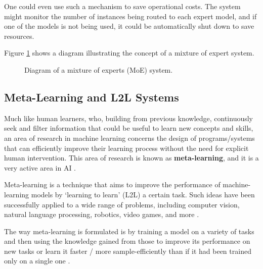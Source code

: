 \documentclass[../main.tex]{subfiles}
\begin{document}
    One could even use such a mechanism to save operational costs. The system might monitor the number of instances being routed to each expert model, and if one of the models is not being used, it could be automatically shut down to save resources.

    Figure \ref{fig:moes} shows a diagram illustrating the concept of a mixture of expert system.

    \begin{figure}[H]
        \centering
        \caption{Diagram of a mixture of experts (MoE) system.}
        \resizebox*{0.8\linewidth}{!}{
            
        }
        \label{fig:moes}
    \end{figure}

  
    \subsection{Meta-Learning and L2L Systems} \label{conclusions:research_directions:l2l} 

    Much like human learners, who, building from previous knowledge, continuously seek and filter information that could be useful to learn new concepts and skills, an area of research in machine learning concerns the design of programs/systems that can efficiently improve their learning process without the need for explicit human intervention. This area of research is known as \textbf{meta-learning}, and it is a very active area in AI .
    
    Meta-learning is a technique that aims to improve the performance of machine-learning models by `learning to learn' (L2L) a certain task. Such ideas have been successfully applied to a wide range of problems, including computer vision, natural language processing, robotics, video games, and more \cite{hospedales_meta-learning_2020}.
    
    The way meta-learning is formulated is by training a model on a variety of tasks and then using the knowledge gained from those to improve its performance on new tasks or learn it faster / more sample-efficiently than if it had been trained only on a single one \cite{hospedales_meta-learning_2020}.
    
\end{document}
